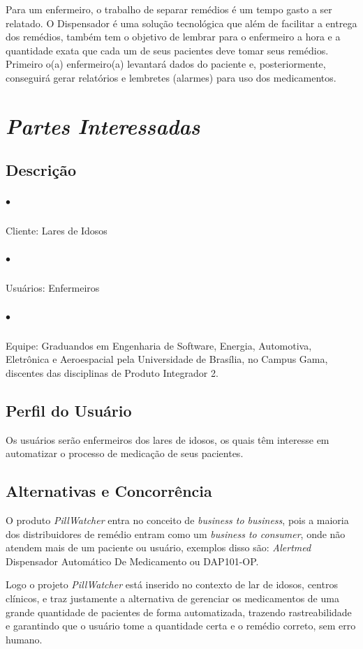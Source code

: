 \begin{apendicesenv}
Para um enfermeiro, o trabalho de separar remédios é um tempo gasto a ser relatado. O Dispensador é uma solução tecnológica que além de facilitar a entrega dos remédios, também tem o objetivo de lembrar para o enfermeiro a hora e a quantidade exata que cada um de seus pacientes deve tomar seus remédios. Primeiro o(a) enfermeiro(a) levantará dados do paciente e, posteriormente, conseguirá gerar relatórios e lembretes (alarmes) para uso dos medicamentos.

\section{\textit{Partes Interessadas}}
\subsection*{Descrição}
\subparagraph*{$\bullet$} Cliente: Lares de Idosos
\subparagraph*{$\bullet$} Usuários: Enfermeiros
\subparagraph*{$\bullet$} Equipe: Graduandos em Engenharia de Software, Energia, Automotiva, Eletrônica e Aeroespacial pela Universidade de Brasília, no Campus Gama, discentes das disciplinas de Produto Integrador 2.

\subsection*{Perfil do Usuário}

Os usuários serão enfermeiros dos lares de idosos, os quais têm interesse em automatizar o processo de medicação de seus pacientes.

\subsection*{Alternativas e Concorrência}

O produto \textit{PillWatcher} entra no conceito de \textit{business to business}, pois a maioria dos distribuidores de remédio entram como um \textit{business to consumer}, onde não atendem mais de um paciente ou usuário, exemplos disso são: \textit{Alertmed} Dispensador Automático De Medicamento ou DAP101-OP.

Logo o projeto \textit{PillWatcher} está inserido no contexto de lar de idosos, centros clínicos, e traz justamente a alternativa de gerenciar os medicamentos de uma grande quantidade de pacientes de forma automatizada, trazendo rastreabilidade e garantindo que o usuário tome a quantidade certa e o remédio correto, sem erro humano.


\end{apendicesenv}
